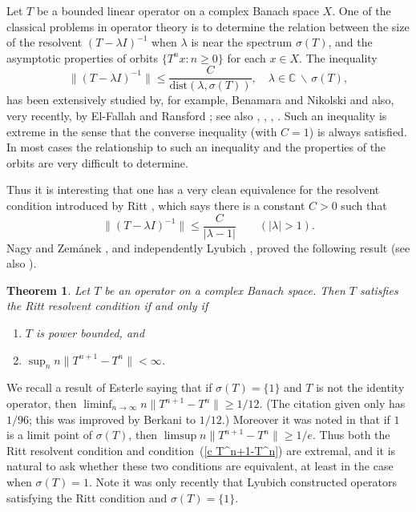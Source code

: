 \documentclass[12pt]{amsart}
\newtheorem{thm}{Theorem}[section]
\newcommand{\modo}[1]{{\left|#1\right|}}
\newcommand{\snormo}[1]{{\mathopen\|#1\mathclose\|}}
\begin{document}
Let $T$ be a bounded linear operator on a complex Banach space $X$.
One of the classical problems in operator theory is to determine
the relation between the size of the resolvent $(T-\lambda I)^{-1}$
when $\lambda$ is
near the spectrum $\sigma(T)$, and the asymptotic properties of
orbits $\{T^n x:  n \ge 0\}$ for each $x \in X$.
The inequality
\[
\snormo{(T-\lambda I)^{-1}} \le \frac{C}{\text{dist}(\lambda, \sigma (T))} ,
\quad \lambda \in \mathbb C \, \backslash \, \sigma (T),
\]
has been extensively studied by,
for example, Benamara and Nikolski \cite{benamara-nikolski}
and also, very recently, by El-Fallah and Ransford \cite{el-fallah-ransford};
see also \cite{lyubich2}, \cite{nagy-zemanek}, \cite{nevanlinna2},
\cite{tomilov-zemanek}.
Such an inequality is extreme in the sense that the converse
inequality (with $C=1$) is always satisfied.
In most cases the relationship to such an inequality and the properties
of the orbits are very difficult to determine.

Thus it is interesting
that one has a very clean equivalence for the resolvent
condition introduced by Ritt \cite{ritt}, which says
there is a constant $C>0$ such that
$$ \snormo{(T-\lambda I)^{-1}} \le \frac C{\modo{\lambda-1}}
   \qquad (\modo\lambda > 1) .$$
Nagy and Zem\'anek \cite{nagy-zemanek}, and independently
Lyubich \cite{lyubich1}, proved the following result
(see also \cite[Theorem 4.5.4]{navanlinna1}).

\begin{thm}
\label{ritt} Let $T$ be an operator on a complex Banach space.
Then $T$ satisfies the Ritt resolvent condition if and only if
\begin{enumerate}
\item $T$ is power bounded, and
\item \label{c T^n+1-T^n}
$\sup_n n\snormo{T^{n+1}-T^n} < \infty$.
\end{enumerate}
\end{thm}

We recall a result of Esterle \cite{esterle} saying that if
$\sigma(T)=\{1\}$ and $T$ is not the identity operator, then
$\liminf_{n\to\infty} n\snormo{T^{n+1}-T^n} \ge 1/12$.  (The
citation given only has $1/96$; this was improved by Berkani
\cite{berkani} to $1/12$.)  Moreover it was noted in \cite[Theorem
4.5.1]{navanlinna1} that if $1$ is a limit point of $\sigma(T)$,
then $\limsup n \snormo{T^{n+1} - T^n} \ge 1/e$. Thus both the
Ritt resolvent condition and condition~(\ref{c T^n+1-T^n}) are
extremal, and it is natural to ask whether these two conditions
are equivalent, at least in the case when $\sigma(T)=1$. Note it
was only recently that Lyubich \cite{lyubich2} constructed
operators satisfying the Ritt condition and $\sigma(T) = \{1\}$.
\end{document}

